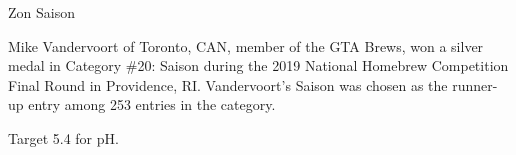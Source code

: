 \begin{recipie}{Zon Saison}

\begin{aboutblock}
Mike Vandervoort of Toronto, CAN, member of the GTA Brews, won a silver medal
in Category \#20: Saison during the 2019 National Homebrew Competition Final Round
in Providence, RI. Vandervoort’s Saison was chosen as the runner-up entry among 253
entries in the category. \sourceaha
\end{aboutblock}


\begin{methodandtiming}
 
\begin{mashsteps}
\end{mashsteps}

\begin{fermentationsteps}
\end{fermentationsteps}

\begin{directions}
Target 5.4 for pH.
\end{directions}

\end{methodandtiming}

\pagebreak

\begin{ingredientsblock}

\begin{malts}
\end{malts}

\begin{hops}
\end{hops}


\end{ingredientsblock}

\end{recipie}


